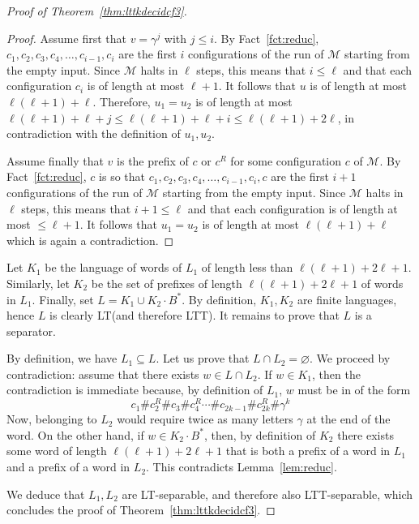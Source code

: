 \documentclass{LMCS}
\newcommand{\lt}{\textup{LT}\xspace}
\newcommand{\ltt}{\textup{LTT}\xspace}
\let\leq\leqslant
\theoremstyle{plain}
\begin{document}
\begin{proof}[Proof of Theorem~\ref{thm:lttkdecidcf3}]
\begin{proof}
  Assume first that $v=\gamma^j$ with $j\leq i$. By
  Fact~\ref{fct:reduc}, $c_1,c_2,c_3,c_4,\ldots,c_{i-1},c_{i}$ are the
  first $i$ configurations of the run of $\mathcal{M}$ starting from the empty
  input. Since $\mathcal{M}$ halts in $\ell$ steps, this means that $i \leq \ell$ and
  that each configuration $c_i$ is of length at most $\ell+1$. It
  follows that $u$ is of length at most $\ell(\ell+1) + \ell$. Therefore,
  $u_1=u_2$ is of length at most $\ell(\ell+1)+ \ell+j \leq\ell(\ell+1)+ \ell+i \leq
  \ell(\ell+1) + 2\ell$, in contradiction with the definition of $u_1,u_2$.

  Assume finally that $v$ is the prefix of $c$ or $c^R$ for some configuration $c$ of
  $\mathcal{M}$. By Fact~\ref{fct:reduc}, $c$ is so that
  $c_1,c_2,c_3,c_4,\ldots,c_{i-1},c_{i},c$ are the first $i+1$
  configurations of the run of $\mathcal{M}$ starting from the empty
  input. Since $\mathcal{M}$ halts in $\ell$ steps, this means that $i+1 \leq \ell$
  and that each configuration is of length at most $\leq \ell+1$. It
  follows that $u_1=u_2$ is of length at most $\ell(\ell+1)+ \ell$ which is
  again a contradiction.
\end{proof}

Let $K_1$ be the language of words of $L_1$ of length less than
$\ell(\ell+1)+2\ell+1$. Similarly, let $K_2$ be the set of prefixes of length
$\ell(\ell+1)+2\ell+1$ of words in $L_1$. Finally, set $L= K_1 \cup K_2 \cdot
B^{*}$. By definition, $K_1,K_2$ are finite languages, hence $L$ is
clearly \lt (and therefore \ltt). It remains to prove that $L$ is a
separator.

By definition, we have $L_1 \subseteq L$. Let us prove that $L \cap
L_2 = \varnothing$. We proceed by contradiction: assume that there
exists $w \in L \cap L_2$. If $w \in K_1$, then the contradiction is
immediate because, by definition of $L_1$, $w$ must be in of the form
\[
c^{}_1\#c_2^{R}\#c^{}_3\#c_4^R \cdots \#c^{}_{2k-1}\#c_{2k}^R \# \gamma^k
\]
Now, belonging to $L_2$ would require twice as many letters $\gamma$ at the end
of the word. On the other hand, if $w \in K_2 \cdot B^{*}$, then, by definition of $K_2$
there exists some word of length $\ell(\ell+1)+2\ell+1$ that is both a prefix
of a word in $L_1$ and a prefix of a word in $L_2$. This contradicts
Lemma~\ref{lem:reduc}.

We deduce that $L_1,L_2$ are \lt-separable, and therefore also
\ltt-separable, which concludes the proof of
Theorem~\ref{thm:lttkdecidcf3}.
\end{proof}
\end{document}
